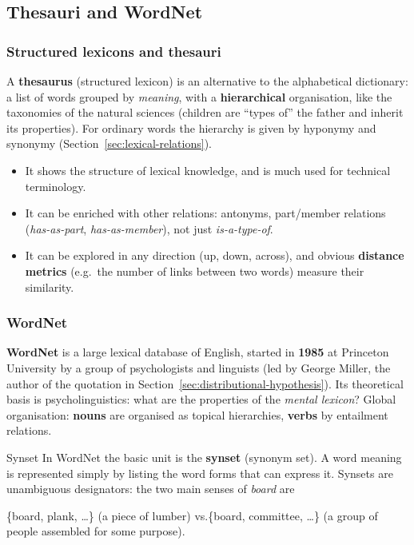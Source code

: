 \subsection{Thesauri and WordNet}
\label{sec:wordnet}

\subsubsection{Structured lexicons and thesauri}

A \textbf{thesaurus} (structured lexicon) is an alternative to the alphabetical
dictionary: a list of words grouped by \emph{meaning}, with a \textbf{hierarchical}
organisation, like the taxonomies of the natural sciences (children are ``types of'' the
father and inherit its properties). For ordinary words the hierarchy is given by hyponymy
and synonymy (Section~\ref{sec:lexical-relations}).
\begin{itemize}[nosep]
  \item It shows the structure of lexical knowledge, and is much used for technical
        terminology.
  \item It can be enriched with other relations: antonyms, part/member relations
        (\emph{has-as-part}, \emph{has-as-member}), not just \emph{is-a-type-of}.
  \item It can be explored in any direction (up, down, across), and obvious
        \textbf{distance metrics} (e.g.\ the number of links between two words) measure
        their similarity.
\end{itemize}

\subsubsection{WordNet}

\textbf{WordNet} is a large lexical database of English, started in \textbf{1985} at
Princeton University by a group of psychologists and linguists (led by George Miller,
the author of the quotation in Section~\ref{sec:distributional-hypothesis}). Its
theoretical basis is psycholinguistics: what are the properties of the \emph{mental
lexicon}? Global organisation: \textbf{nouns} are organised as topical hierarchies,
\textbf{verbs} by entailment relations.

\begin{nbdef}{Synset}
In WordNet the basic unit is the \textbf{synset} (synonym set). A word meaning is
represented simply by listing the word forms that can express it. Synsets are
unambiguous designators: the two main senses of \emph{board} are
\begin{center}
\{board, plank, \ldots\} \quad (a piece of lumber) \qquad vs.\qquad \{board, committee, \ldots\}
\quad (a group of people assembled for some purpose).
\end{center}
\end{nbdef}

